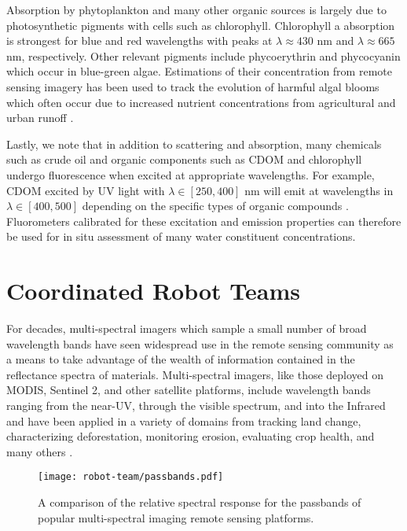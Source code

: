 Absorption by phytoplankton and many other organic sources is largely due to
photosynthetic pigments with cells such as chlorophyll. Chlorophyll a
absorption is strongest for blue and red wavelengths with peaks at
$\lambda\approx 430$ nm and $\lambda\approx 665$ nm, respectively. Other
relevant pigments include phycoerythrin and phycocyanin  which occur in
blue-green algae. Estimations of their concentration from remote sensing imagery
has been used to track the evolution of harmful algal blooms which often occur
due to increased nutrient concentrations from agricultural and urban runoff
\cite{algal-blooms-rs}.

Lastly, we note that in addition to scattering and absorption, many chemicals
such as crude oil and organic components such as CDOM and chlorophyll undergo
fluorescence when excited at appropriate wavelengths. For example, CDOM excited
by UV light with $\lambda\in[250, 400]$ nm will emit at wavelengths in
$\lambda\in[400, 500]$ depending on the specific types of organic compounds
\cite{cdom-fluorescence}. Fluorometers calibrated for these excitation
and emission properties can therefore be used for in situ assessment of many
water constituent concentrations.

\section{Coordinated Robot Teams}

For decades, multi-spectral imagers which sample a small number of
broad wavelength bands have seen widespread use in
the remote sensing community as a means to take advantage of the wealth of
information contained in the reflectance spectra of materials. Multi-spectral imagers,
like those deployed on MODIS, Sentinel 2, and other satellite platforms, include
wavelength bands ranging from the near-UV,
through the visible spectrum, and into the Infrared and have been applied in a
variety of domains from tracking land change, characterizing deforestation,
monitoring erosion, evaluating crop health, and many others
\cite{remote-sensing-foliage, remote-sensing-applications, thenkabail-indices}.

\begin{figure}[!hbt]
  \centering
  \texttt{[image: robot-team/passbands.pdf]}
  \caption{A comparison of the relative spectral response for the passbands of popular multi-spectral imaging remote sensing platforms.}
  \label{fig:passbands}
\end{figure}

